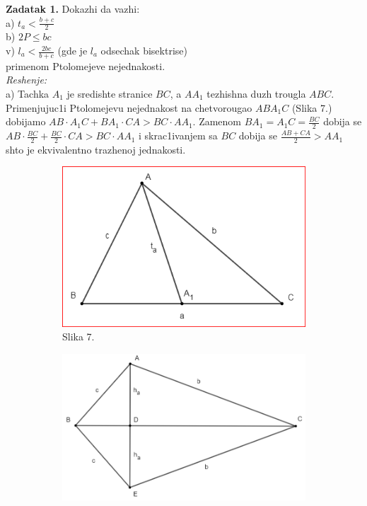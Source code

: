 \documentclass[11pt,letter]{report}
\newcommand{\D}{\displaystyle}
\begin{document}
\begin{flushleft}
\large
\textbf{Zadatak 1.} Dokazhi da vazhi: \\
a) $\D t_a<\frac{b+c}{2}$ \\
b) $\D 2P\leq bc$ \\
v) $\D l_a<\frac{2bc}{b+c}$ (gde je $l_a$ odsechak bisektrise)\\
primenom Ptolomejeve nejednakosti.\\
\vspace{0.05cm}
\textit{Reshenje:}\\
\vspace{0.05cm}
a) Tachka $A_1$ je sredishte stranice $BC$, a $AA_1$ tezhishna duzh trougla $ABC$. Primenjujuc1i Ptolomejevu nejednakost na chetvorougao $ABA_1C$ (Slika 7.) dobijamo
$AB\cdot A_1C+BA_1\cdot CA>BC\cdot AA_1$. Zamenom $\D BA_1=A_1C=\frac{BC}{2}$ dobija se $\D AB\cdot \frac{BC}{2}+\frac{BC}{2}\cdot CA>BC\cdot AA_1$ i skrac1ivanjem sa $BC$ dobija se $\D \frac{AB+CA}{2}>AA_1$ shto je ekvivalentno trazhenoj jednakosti.\\
\vspace{0.2cm}
\begin{figure}[h!]
\begin{subfigure}{0.4\textwidth}
\includegraphics[width=\linewidth]{Slike/Slika8}
\caption*{Slika 7.} 
\end{subfigure}
\hspace*{\fill}
\begin{subfigure}{0.48\textwidth}
\includegraphics[width=\linewidth]{Slike/Slika91}

\end{subfigure}
\end{figure}
\end{flushleft}
\end{document}
